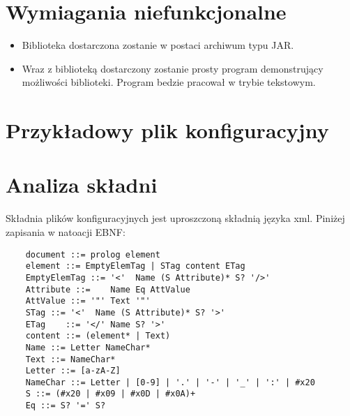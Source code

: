 \documentclass{article}
\begin{document}
\section{Wymiagania niefunkcjonalne}
\begin{itemize}
	\item Biblioteka dostarczona zostanie w postaci archiwum typu JAR.
	\item Wraz z biblioteką dostarczony zostanie prosty program demonstrujący możliwości biblioteki.
	Program bedzie pracował w trybie tekstowym.
\end{itemize}

\section{Przykładowy plik konfiguracyjny}


\section{Analiza składni}
Składnia plików konfiguracyjnych jest uproszczoną składnią języka xml.
Piniżej zapisania w natoacji EBNF:

\begin{verbatim} 
	document ::= prolog element
	element	::=	EmptyElemTag | STag content ETag
	EmptyElemTag ::= '<'  Name (S Attribute)* S? '/>'
	Attribute ::=	 Name Eq AttValue	
	AttValue ::= '"' Text '"'
	STag ::= '<'  Name (S Attribute)* S? '>'
	ETag	::=	'</' Name S? '>'
	content	::=	(element* | Text)
	Name ::= Letter NameChar*
	Text ::= NameChar*
	Letter ::= [a-zA-Z]
	NameChar ::= Letter | [0-9] | '.' | '-' | '_' | ':' | #x20
	S ::= (#x20 | #x09 | #x0D | #x0A)+
	Eq ::= S? '=' S?
\end{verbatim}
\end{document}
